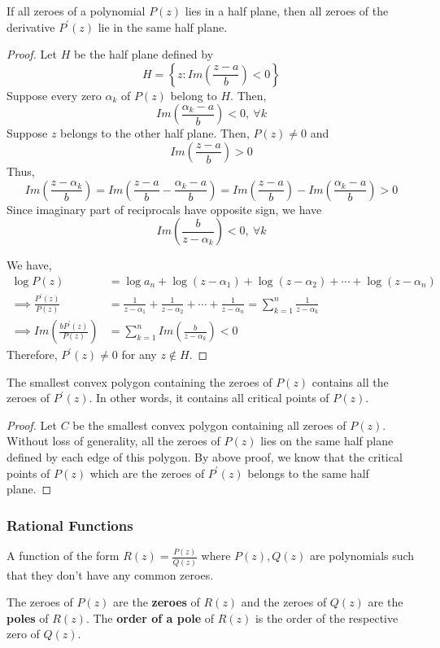 \begin{theorem}[Lucas]
	If all zeroes of a polynomial $P(z)$ lies in a half plane, then all zeroes of the derivative $P^\prime(z)$ lie in the same half plane.
\end{theorem}
\begin{proof}
	Let $H$ be the half plane defined by
	\[ H = \left\{ z : Im{\left(\frac{z-a}{b}\right)}<0\right\} \]
	Suppose every zero $\alpha_k$ of $P(z)$ belong to $H$.
	Then,
	\[ Im\left(\frac{\alpha_k-a}{b}\right) < 0,\ \forall k \]
	Suppose $z$ belongs to the other half plane.
	Then, $P(z) \ne 0$ and
	\[ Im\left(\frac{z-a}{b}\right) > 0 \]
	Thus,
	\[ Im\left(\frac{z-\alpha_k}{b}\right) = Im\left(\frac{z-a}{b}-\frac{\alpha_k-a}{b}\right) = Im\left(\frac{z-a}{b}\right)-Im\left(\frac{\alpha_k-a}{b}\right) > 0 \]
	Since imaginary part of reciprocals have opposite sign, we have
	\[ Im\left(\frac{b}{z-\alpha_k}\right) < 0,\ \forall k \]

	We have,
	\begin{align*}
		\log P(z) 
			& = \log a_n + \log (z-\alpha_1) + \log (z-\alpha_2) + \dotsb + \log (z-\alpha_n) \\
		\implies \frac{P^\prime(z)}{P(z)} 
			& = \frac{1}{z-\alpha_1}+\frac{1}{z-\alpha_2}+\dotsb+\frac{1}{z-\alpha_n} = \sum_{k=1}^n \frac{1}{z-\alpha_k} \\
		\implies Im\left(\frac{bP^\prime(z)}{P(z)}\right)
			& = \sum_{k=1}^n Im\left(\frac{b}{z-\alpha_k}\right) < 0
\end{align*}
	 Therefore, $P^\prime(z) \ne 0$ for any $z \notin H$.
\end{proof}
\begin{commentary}
\begin{theorem}[Lucas]
	The smallest convex polygon containing the zeroes of $P(z)$ contains all the zeroes of $P^\prime(z)$. In other words, it contains all critical points of $P(z)$.
\end{theorem}
\begin{proof}
	Let $C$ be the smallest convex polygon containing all zeroes of $P(z)$.
	Without loss of generality, all the zeroes of $P(z)$ lies on the same half plane defined by each edge of this polygon.
	By above proof, we know that the critical points of $P(z)$ which are the zeroes of $P^\prime(z)$ belongs to the same half plane.
\end{proof}
\end{commentary}

\subsubsection{Rational Functions}
\begin{definition}
	A function of the form $R(z) = \frac{P(z)}{Q(z)}$ where $P(z),Q(z)$ are polynomials such that they don't have any common zeroes.
\end{definition}
The zeroes of $P(z)$ are the \textbf{zeroes} of $R(z)$ and the zeroes of $Q(z)$ are the \textbf{poles} of $R(z)$.
The \textbf{order of a pole} of $R(z)$ is the order of the respective zero of $Q(z)$.

